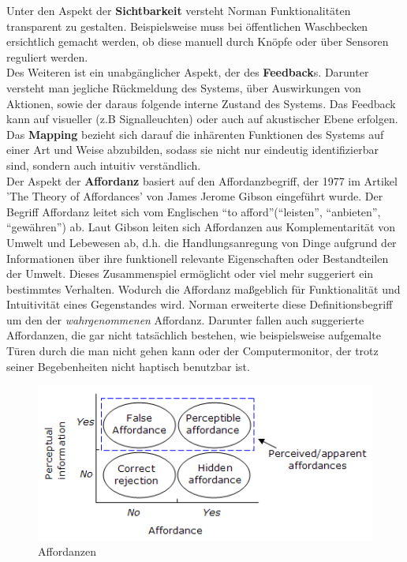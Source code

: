 \documentclass[parskip,headsepline, headtopline, %
footsepline, oneside, 12pt, headings=small]{scrreprt}
\begin{document}
Unter den Aspekt der \textbf{Sichtbarkeit} versteht Norman Funktionalitäten transparent zu gestalten. Beispielsweise muss bei öffentlichen Waschbecken ersichtlich gemacht werden, ob diese manuell durch Knöpfe oder über Sensoren reguliert werden.\\
   
Des Weiteren ist ein unabgänglicher Aspekt, der des \textbf{Feedback}s. Darunter versteht man jegliche Rückmeldung des Systems, über Auswirkungen von Aktionen, sowie der daraus folgende interne Zustand des Systems. Das Feedback kann auf visueller (z.B Signalleuchten) oder auch auf akustischer Ebene erfolgen.\\
 
Das	\textbf{Mapping} bezieht sich darauf die inhärenten Funktionen des Systems auf einer Art und Weise abzubilden, sodass sie nicht nur eindeutig identifizierbar sind, sondern auch intuitiv verständlich.\\

Der Aspekt der \textbf{Affordanz} basiert auf den Affordanzbegriff, der 1977 im Artikel 'The Theory of Affordances' von James Jerome Gibson eingeführt wurde. Der Begriff Affordanz leitet sich vom Englischen “to afford”(“leisten”, “anbieten”, “gewähren”) ab. Laut Gibson leiten sich Affordanzen aus Komplementarität von Umwelt und Lebewesen ab, d.h.  
die Handlungsanregung von Dinge aufgrund der Informationen über ihre funktionell relevante Eigenschaften oder Bestandteilen der Umwelt. Dieses Zusammenspiel ermöglicht oder viel mehr suggeriert ein bestimmtes Verhalten. Wodurch die Affordanz maßgeblich für Funktionalität und Intuitivität eines Gegenstandes wird.
Norman erweiterte diese Definitionsbegriff um den der \textit{wahrgenommenen} Affordanz. Darunter fallen auch suggerierte Affordanzen, die gar nicht tatsächlich bestehen, wie beispielsweise aufgemalte Türen durch die man nicht gehen kann oder der Computermonitor, der trotz seiner Begebenheiten nicht haptisch benutzbar ist. 

\begin{figure}
\includegraphics{images/figure2_affordances.png}
\caption{Affordanzen}
\label{fig:affordanz}
\end{figure}
\end{document}
